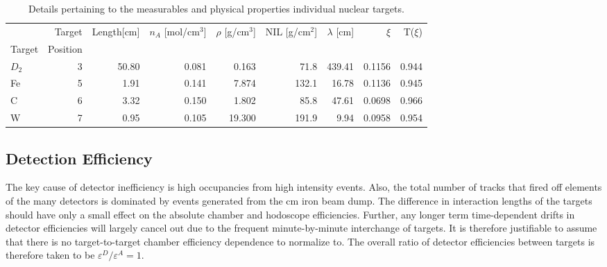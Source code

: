 \begin{table}
	\centering
\begin{tabular}{lrrrrrrrr}
	\toprule
	{} &  Target &  Length[cm] & $n_A$ [mol/cm$^3$] & $\rho$ [g/cm$^3$] &  NIL [g/cm$^2$] &   $\lambda$ [cm] & $\xi$ & T($\xi$) \\
	Target & Position & & & & & & & \\
	\midrule
	$D_2$ & 3 & 50.80 & 0.081 & 0.163 & 71.8 & 439.41 & 0.1156 & 0.944 \\
	Fe & 5 & 1.91 &	0.141 & 7.874 & 132.1 & 16.78 & 0.1136 & 0.945 \\
	C & 6 & 3.32 & 0.150 & 1.802 & 85.8 & 47.61 & 0.0698 & 0.966 \\
	W & 7 & 0.95 & 0.105 & 19.300 & 191.9 & 9.94 & 0.0958 & 0.954 \\
	\bottomrule
\end{tabular}
\caption{Details pertaining to the measurables and physical properties individual nuclear targets.}
\label{tab:targ-details}
\end{table}


\subsection{Detection Efficiency}

The key cause of detector inefficiency is high occupancies from high intensity events. Also, the total number of tracks that fired off elements of the many detectors is dominated by events generated from the \unit[503]{cm} iron beam dump. The difference in interaction lengths of the targets should have only a small effect on the absolute chamber and hodoscope efficiencies. Further, any longer term time-dependent drifts in detector efficiencies will largely cancel out due to the frequent minute-by-minute interchange of targets. It is therefore justifiable to assume that there is no target-to-target chamber efficiency dependence to normalize to. The overall ratio of detector efficiencies between targets is therefore taken to be $\varepsilon^D/\varepsilon^A=1$. 

